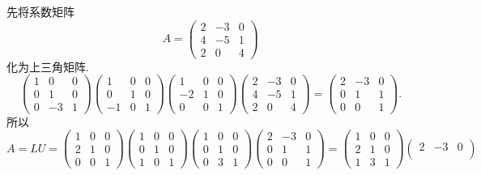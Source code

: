 ﻿\documentclass{book} \usepackage{exsheets} \usepackage{xeCJK}
\begin{document}
\begin{solution}
  先将系数矩阵
$$
A=
\begin{pmatrix}
  2&-3&0\\
  4&-5&1\\
  2&0&4
\end{pmatrix}
$$
化为上三角矩阵.
$$
\begin{pmatrix}
  1&0&0\\
  0&1&0\\
  0&-3&1
\end{pmatrix}
\begin{pmatrix}
  1&0&0\\
  0&1&0\\
  -1&0&1
\end{pmatrix}
\begin{pmatrix}
  1&0&0\\
  -2&1&0\\
  0&0&1
\end{pmatrix}
\begin{pmatrix}
  2&-3&0\\
  4&-5&1\\
  2&0&4
\end{pmatrix}=
\begin{pmatrix}
  2&-3&0\\
  0&1&1\\
  0&0&1
\end{pmatrix}.
$$
所以
$$
A=LU=
\begin{pmatrix}
  1&0&0\\
  2&1&0\\
  0&0&1
\end{pmatrix}
\begin{pmatrix}
  1&0&0\\
  0&1&0\\
  1&0&1
\end{pmatrix}
\begin{pmatrix}
  1&0&0\\
  0&1&0\\
  0&3&1
\end{pmatrix}
\begin{pmatrix}
  2&-3&0\\
  0&1&1\\
  0&0&1
\end{pmatrix}=
\begin{pmatrix}
  1&0&0\\
  2&1&0\\
  1&3&1
\end{pmatrix}
\begin{pmatrix}
  2&-3&0\\

\end{pmatrix}$$
\end{solution}
\end{document}

